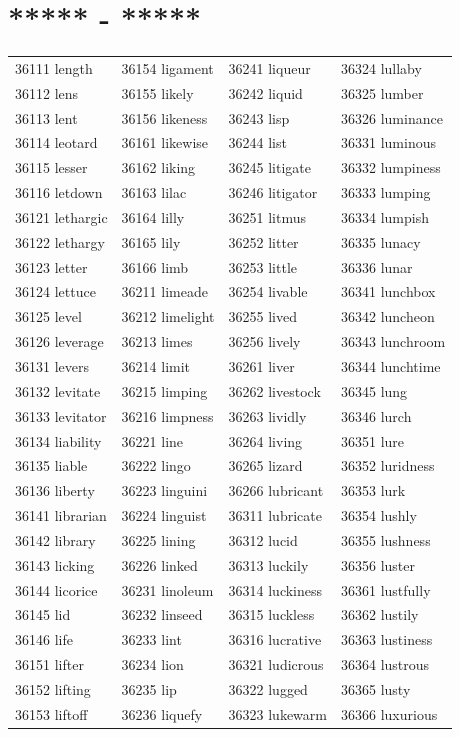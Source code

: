 \documentclass[10pt, oneside]{book}
\begin{document}
\begin{table}[h]
	\centering
	\section*{***** - *****}
	\begin{tabular}{l l l l}
36111 length &36154 ligament &36241 liqueur &36324 lullaby\\
36112 lens &36155 likely &36242 liquid &36325 lumber\\
36113 lent &36156 likeness &36243 lisp &36326 luminance\\
36114 leotard &36161 likewise &36244 list &36331 luminous\\
36115 lesser &36162 liking &36245 litigate &36332 lumpiness\\
36116 letdown &36163 lilac &36246 litigator &36333 lumping\\
36121 lethargic &36164 lilly &36251 litmus &36334 lumpish\\
36122 lethargy &36165 lily &36252 litter &36335 lunacy\\
36123 letter &36166 limb &36253 little &36336 lunar\\
36124 lettuce &36211 limeade &36254 livable &36341 lunchbox\\
36125 level &36212 limelight &36255 lived &36342 luncheon\\
36126 leverage &36213 limes &36256 lively &36343 lunchroom\\
36131 levers &36214 limit &36261 liver &36344 lunchtime\\
36132 levitate &36215 limping &36262 livestock &36345 lung\\
36133 levitator &36216 limpness &36263 lividly &36346 lurch\\
36134 liability &36221 line &36264 living &36351 lure\\
36135 liable &36222 lingo &36265 lizard &36352 luridness\\
36136 liberty &36223 linguini &36266 lubricant &36353 lurk\\
36141 librarian &36224 linguist &36311 lubricate &36354 lushly\\
36142 library &36225 lining &36312 lucid &36355 lushness\\
36143 licking &36226 linked &36313 luckily &36356 luster\\
36144 licorice &36231 linoleum &36314 luckiness &36361 lustfully\\
36145 lid &36232 linseed &36315 luckless &36362 lustily\\
36146 life &36233 lint &36316 lucrative &36363 lustiness\\
36151 lifter &36234 lion &36321 ludicrous &36364 lustrous\\
36152 lifting &36235 lip &36322 lugged &36365 lusty\\
36153 liftoff &36236 liquefy &36323 lukewarm &36366 luxurious\\
	\end{tabular}
 \end{table}
\end{document}
